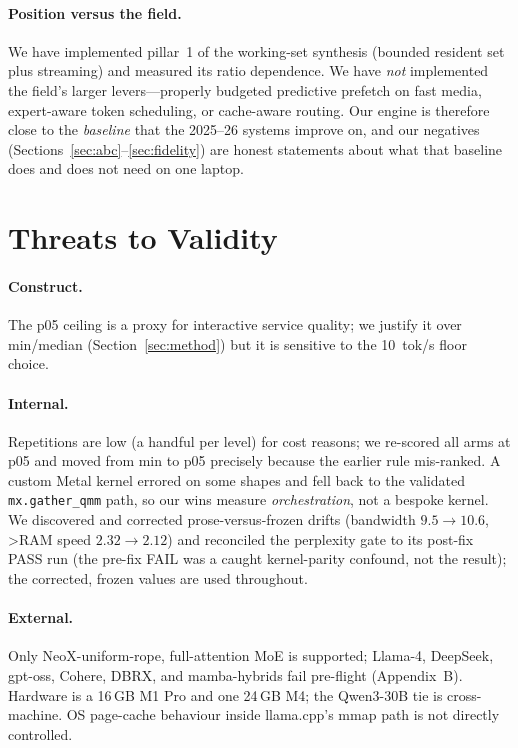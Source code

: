\documentclass[11pt]{article}
\begin{document}
\paragraph{Position versus the field.} We have implemented pillar~1 of the working-set
synthesis (bounded resident set plus streaming) and measured its ratio dependence. We
have \emph{not} implemented the field's larger levers---properly budgeted predictive
prefetch on fast media, expert-aware token scheduling, or cache-aware routing. Our engine
is therefore close to the \emph{baseline} that the 2025--26 systems improve on, and our
negatives (Sections~\ref{sec:abc}--\ref{sec:fidelity}) are honest statements about what
that baseline does and does not need on one laptop.

\section{Threats to Validity}

\paragraph{Construct.} The p05 ceiling is a proxy for interactive service quality; we
justify it over min/median (Section~\ref{sec:method}) but it is sensitive to the \SI{10}{tok/s}
floor choice.

\paragraph{Internal.} Repetitions are low (a handful per level) for cost reasons; we
re-scored all arms at p05 and moved from min to p05 precisely because the earlier rule
mis-ranked. A custom Metal kernel errored on some shapes and fell back to the validated
\texttt{mx.gather\_qmm} path, so our wins measure \emph{orchestration}, not a bespoke
kernel. We discovered and corrected prose-versus-frozen drifts (bandwidth $9.5\rightarrow
10.6$, >RAM speed $2.32\rightarrow2.12$) and reconciled the perplexity gate to its
post-fix PASS run (the pre-fix FAIL was a caught kernel-parity confound, not the result);
the corrected, frozen values are used throughout.

\paragraph{External.} Only NeoX-uniform-rope, full-attention MoE is supported; Llama-4,
DeepSeek, gpt-oss, Cohere, DBRX, and mamba-hybrids fail pre-flight
(Appendix~B). Hardware is a 16\,GB M1 Pro and one 24\,GB M4; the Qwen3-30B tie is
cross-machine. OS page-cache behaviour inside llama.cpp's mmap path is not directly
controlled.
\end{document}
